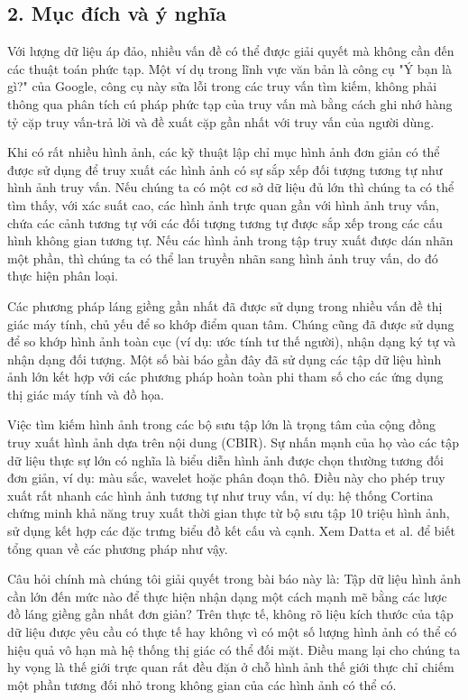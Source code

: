 \documentclass[../main.tex]{subfiles}
\begin{document}
\subsection*{2. Mục đích và ý nghĩa}

Với lượng dữ liệu áp đảo, nhiều vấn đề có thể được giải quyết mà không cần đến các thuật toán phức tạp. Một ví dụ trong lĩnh vực văn bản là công cụ "Ý bạn là gì?" của Google, công cụ này sửa lỗi trong các truy vấn tìm kiếm, không phải thông qua phân tích cú pháp phức tạp của truy vấn mà bằng cách ghi nhớ hàng tỷ cặp truy vấn-trả lời và đề xuất cặp gần nhất với truy vấn của người dùng. 

Khi có rất nhiều hình ảnh, các kỹ thuật lập chỉ mục hình ảnh đơn giản có thể được sử dụng để truy xuất các hình ảnh có sự sắp xếp đối tượng tương tự như hình ảnh truy vấn. Nếu chúng ta có một cơ sở dữ liệu đủ lớn thì chúng ta có thể tìm thấy, với xác suất cao, các hình ảnh trực quan gần với hình ảnh truy vấn, chứa các cảnh tương tự với các đối tượng tương tự được sắp xếp trong các cấu hình không gian tương tự. Nếu các hình ảnh trong tập truy xuất được dán nhãn một phần, thì chúng ta có thể lan truyền nhãn sang hình ảnh truy vấn, do đó thực hiện phân loại.

Các phương pháp láng giềng gần nhất đã được sử dụng trong nhiều vấn đề thị giác máy tính, chủ yếu để so khớp điểm quan tâm. Chúng cũng đã được sử dụng để so khớp hình ảnh toàn cục (ví dụ: ước tính tư thế người), nhận dạng ký tự và nhận dạng đối tượng. Một số bài báo gần đây đã sử dụng các tập dữ liệu hình ảnh lớn kết hợp với các phương pháp hoàn toàn phi tham số cho các ứng dụng thị giác máy tính và đồ họa.

Việc tìm kiếm hình ảnh trong các bộ sưu tập lớn là trọng tâm của cộng đồng truy xuất hình ảnh dựa trên nội dung (CBIR). Sự nhấn mạnh của họ vào các tập dữ liệu thực sự lớn có nghĩa là biểu diễn hình ảnh được chọn thường tương đối đơn giản, ví dụ: màu sắc, wavelet hoặc phân đoạn thô. Điều này cho phép truy xuất rất nhanh các hình ảnh tương tự như truy vấn, ví dụ: hệ thống Cortina chứng minh khả năng truy xuất thời gian thực từ bộ sưu tập 10 triệu hình ảnh, sử dụng kết hợp các đặc trưng biểu đồ kết cấu và cạnh. Xem Datta et al. để biết tổng quan về các phương pháp như vậy.

Câu hỏi chính mà chúng tôi giải quyết trong bài báo này là: Tập dữ liệu hình ảnh cần lớn đến mức nào để thực hiện nhận dạng một cách mạnh mẽ bằng các lược đồ láng giềng gần nhất đơn giản? Trên thực tế, không rõ liệu kích thước của tập dữ liệu được yêu cầu có thực tế hay không vì có một số lượng hình ảnh có thể có hiệu quả vô hạn mà hệ thống thị giác có thể đối mặt. Điều mang lại cho chúng ta hy vọng là thế giới trực quan rất đều đặn ở chỗ hình ảnh thế giới thực chỉ chiếm một phần tương đối nhỏ trong không gian của các hình ảnh có thể có.
\end{document}
